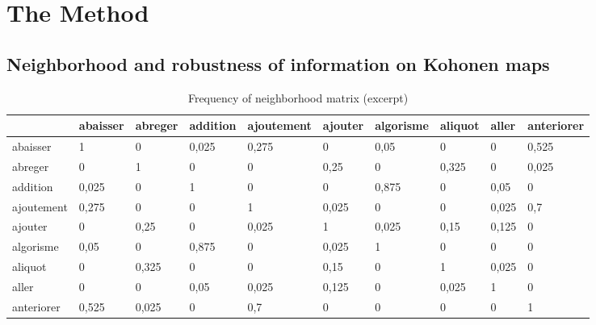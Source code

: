 \documentclass[runningheads,a4paper]{llncs}
\begin{document}
\section{The Method}

\subsection{Neighborhood and robustness of information on Kohonen maps}
\label{m1}

\begin{table}
\begin{tabular}{|l|l|l|l|l|l|l|l|l|l|}
\hline
 & abaisser & abreger & addition & ajoutement & ajouter & algorisme & aliquot & aller & anteriorer \\ \hline
abaisser  & \cellcolor{gris} 1 & 0 & \cellcolor{grisclair} 0,025 & \cellcolor{gris} 0,275 & 0 & \cellcolor{grisclair} 0,05 & 0 & 0 & \cellcolor{gris} 0,525\\ \hline
abreger & 0 & \cellcolor{gris} 1 & 0 & 0 & \cellcolor{gris} 0,25 & 0 & \cellcolor{gris} 0,325 & 0 & \cellcolor{grisclair} 0,025\\ \hline
addition & \cellcolor{grisclair} 0,025 & 0 & \cellcolor{gris} 1 & 0 & 0 & \cellcolor{gris} 0,875 & 0 & \cellcolor{grisclair} 0,05 & 0\\ \hline
ajoutement  & \cellcolor{gris} 0,275 & 0 & 0 & \cellcolor{gris} 1 & \cellcolor{grisclair} 0,025 & 0 & 0 & \cellcolor{grisclair} 0,025 & \cellcolor{gris} 0,7\\ \hline
ajouter & 0 & \cellcolor{gris} 0,25 & 0 & \cellcolor{grisclair} 0,025 & \cellcolor{gris} 1 & \cellcolor{grisclair} 0,025 & \cellcolor{grisclair} 0,15 & \cellcolor{grisclair} 0,125 & 0\\ \hline
algorisme & \cellcolor{grisclair} 0,05 & 0 & \cellcolor{gris} 0,875 & 0 & \cellcolor{grisclair} 0,025 & \cellcolor{gris} 1 & 0 & 0 & 0\\ \hline
aliquot & 0 & \cellcolor{gris} 0,325 & 0 & 0 & \cellcolor{grisclair} 0,15 & 0 & \cellcolor{gris} 1 & \cellcolor{grisclair} 0,025 & 0\\ \hline
aller & 0 & 0 & \cellcolor{grisclair} 0,05 & \cellcolor{grisclair} 0,025 & \cellcolor{grisclair} 0,125 & 0 & \cellcolor{grisclair} 0,025 & \cellcolor{gris} 1 & 0\\ \hline
anteriorer & \cellcolor{gris} 0,525 & \cellcolor{grisclair} 0,025 & 0 & \cellcolor{gris} 0,7 & 0 & 0 & 0 & 0 & \cellcolor{gris} 1 \\ \hline
\end{tabular}
\label{bertin1}
\caption{Frequency of neighborhood matrix (excerpt)}
\end{table}
\end{document}
